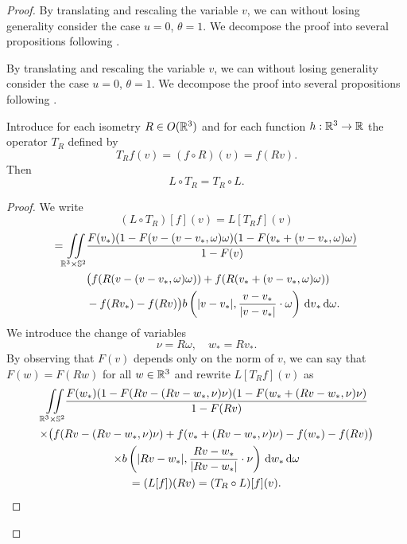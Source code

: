 \begin{subappendices}
\begin{proof}
By translating and rescaling the variable $v$, we can without losing generality consider the case $u=0$, $\theta=1$. We decompose the proof into several propositions following \cite{desvillettes1994remark}.

	By translating and rescaling the variable $v$, we can without losing generality consider the case $u=0$, $\theta=1$. We decompose the proof into several propositions following \cite{desvillettes1994remark}.
\begin{proposition}\label{le:rotL} Introduce for each isometry $R\in O({\mathbb {R}^3})$ and for each function $h:{\mathbb {R}^3}\to {\mathbb {R}}$ the operator $T_R$ defined by
\[T_Rf(v)=(f\circ R)(v) = f(Rv). \]
Then
\[L\circ T_R=T_R\circ L.\]
\end{proposition}
\begin{proof}
	We write \[(L\circ T_R)[f](v)=L[T_Rf](v)\]
	 \begin{align*}=
	{\iint\limits_{\mathbb R^3\times\mathbb S^2}}& \frac{F(v_\ast)(1-F(  v-(v-v_\ast,\omega)\omega)(1-F(v_\ast+(v-v_\ast,\omega)\omega )}{1-F( v)}\\&\big(f(R(v-(v-v_\ast,\omega)\omega) )+f(R(v_\ast+(v-v_\ast,\omega)\omega))\\&-f(Rv_\ast)-f(Rv)\big)b\left(|v-v_\ast|,\frac{v-v_\ast}{|v-v_\ast|}\cdot\omega\right) {\,\mathrm{d} v}_\ast {\,\mathrm{d} \omega}	.
	\end{align*} 
	We introduce the change of variables
	\begin{equation*}
		\nu=R\omega,\quad w_\ast=Rv_\ast.
	\end{equation*}
	By observing that $F(v)$ depends only on the norm of $v$, we can say that $F(w)=F(Rw)$  for all $w\in {\mathbb {R}^3}$ and rewrite $L[T_Rf](v)$ as 
	\begin{multline*}
	{\iint\limits_{\mathbb R^3\times\mathbb S^2}}  \frac{F(w_\ast)(1-F(  Rv-(Rv-w_\ast,\nu)\nu)(1-F(w_\ast+(Rv-w_\ast,\nu)\nu )}{1-F( Rv)}\\ \times\big(f(Rv-(Rv-w_\ast,\nu)\nu )+f(v_\ast+(Rv-w_\ast,\nu)\nu)-f(w_\ast)-f(Rv)\big)\\
	\times b\left(|Rv-w_\ast|,\frac{Rv-w_\ast}{|Rv-w_\ast|}\cdot\nu\right) \,\mathrm {d} w_\ast {\,\mathrm{d} \omega}	\\
	 =(L[f])(Rv) = (T_R\circ L)[f](v).
	\end{multline*} 	%
\end{proof}


\end{proof}
\end{subappendices}
